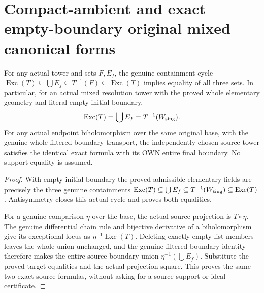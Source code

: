 \section{Compact-ambient and exact empty-boundary original mixed canonical forms}
\label{sec:hironaka-original-nonpure-canonical-specializations}

\begin{theorem}
\label{hir:original-nonpure-empty-boundary-exact-support}
For any actual tower and sets $F,E_f$, the genuine containment cycle
$\operatorname{Exc}(T)\subseteq\bigcup E_f\subseteq T^{-1}(F)
\subseteq\operatorname{Exc}(T)$ implies equality of all three sets.
In particular, for an actual mixed resolution tower with the proved whole elementary
geometry and literal empty initial boundary,
\[
 \operatorname{Exc}(T)=\bigcup E_f=T^{-1}(W_{\rm sing}).
\]
For any actual endpoint biholomorphism over the same original base,
with the genuine whole filtered-boundary transport, the independently
chosen source tower satisfies the identical exact formula with its
OWN entire final boundary. No support equality is assumed.
\leanok
\end{theorem}
\begin{proof}
With empty initial boundary the proved admissible elementary fields
are precisely the three genuine containments
$\operatorname{Exc}(T)\subseteq\bigcup E_f
\subseteq T^{-1}(W_{\rm sing})\subseteq\operatorname{Exc}(T)$.
Antisymmetry closes this actual cycle and proves both equalities.

For a genuine comparison $\eta$ over the base, the actual source
projection is $T\circ\eta$. The genuine differential chain rule and
bijective derivative of a biholomorphism give its exceptional locus
as $\eta^{-1}\operatorname{Exc}(T)$. Deleting exactly empty list
members leaves the whole union unchanged, and the genuine filtered
boundary identity therefore makes the entire source boundary union
$\eta^{-1}(\bigcup E_f)$. Substitute the proved target equalities and
the actual projection square. This proves the same two exact source
formulas, without asking for a source support or ideal certificate.
\end{proof}

